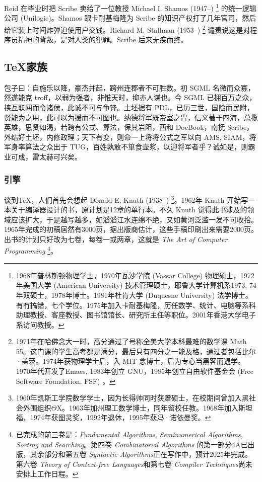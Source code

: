 Reid 在毕业时把 Scribe 卖给了一位教授 Michael I. Shamos (1947--)\indexShamos{} \footnote{1968年普林斯顿物理学士，1970年瓦沙学院 (Vassar College) 物理硕士，1972年美国大学 (American University) 技术管理硕士，耶鲁大学计算机系1973, 74年双硕士，1978年博士。1981年杜肯大学 (Duquesne University) 法学博士。有冇搞错，七个学位。1975年加入卡耐基梅隆，历任数学、统计、电脑等系科助理教授、客座教授、图书馆馆长、研究所主任等职位。2001年香港大学电子系访问教授。} 的统一逻辑公司 (Unilogic)\indexUnilogic{}。Shamos 跟卡耐基梅隆为 Scribe 的知识产权打了几年官司，然后给它装上时间炸弹迫使用户交钱。Richard M. Stallman (1953--)\indexStallman{} \footnote{1971年在哈佛念大一时，高分通过了号称全美大学本科最难的数学课 Math 55。这门课的学生高考都是满分，最后只有四分之一能及格，通过者包括比尔·盖茨。1974年获物理学士后，入 MIT 念博士，后为专心当黑客而退学。1970年代开发了Emacs, 1983年创立 GNU，1985年创立自由软件基金会 (Free Software Foundation, FSF) 。} 谴责说这是对程序员精神的背叛，是对人类的犯罪。Scribe 后来无疾而终。

\subsection{\TeX 家族}
\label{sec:tex}

包子曰：自施乐以降，豪杰并起，跨州连郡者不可胜数。初 SGML 名微而众寡，然遂能克 troff，以弱为强者，非惟天时，抑亦人谋也。今 SGML 已拥百万之众，挟互联网而令诸侯，此诚不可与争锋。土坯据有 PDL，已历三世，国险而民附，贤能为之用，此可以为援而不可图也。纳德将军既帝室之胄，信义著于四海，总揽英雄，思贤如渴，若跨有公式、算法，保其岩阻，西和 DocBook，南抚 Scribe，外结好土坯，内修政理；天下有变，则命一上将将公式之军以向 AMS, SIAM，将军身率算法之众出于 TUG，百姓孰敢不箪食壶浆，以迎将军者乎？诚如是，则霸业可成，雷太赫可兴矣。

\subsubsection{引擎}

谈到\TeX{}，人们首先会想起 Donald E. Knuth (1938--)\indexKnuth{} \footnote{1960年凯斯工学院数学学士，因为长得帅同时获赠硕士，在校期间曾加入黑社会外围组织$\Theta\mathrm{X}$。1963年加州理工数学博士，同年留校任教。1968年加入斯坦福\indexStanford{}，1974年获图灵奖，1992年退休，1995年获冯·诺依曼奖。}。1962年 Knuth 开始写一本关于编译器设计的书，原计划是12章的单行本。不久 Knuth 觉得此书涉及的领域应该扩大，于是越写越多，如滔滔江水连绵不绝，又如黄河泛滥一发不可收拾。1965年完成的初稿居然有3000页，据出版商估计，这些手稿印刷出来需要2000页。出书的计划只好改为七卷，每卷一或两章，这就是 \emph{The Art of Computer Programming} \footnote{已完成的前三卷是：\emph{Fundamental Algorithms}, \emph{Seminumerical Algorithms}, \emph{Sorting and Searching}。第四卷 \emph{Combinatorial Algorithms} 的第一部分4A已出版，其余部分和第五卷 \emph{Syntactic Algorithms}正在写作中，预计2025年完成。第六卷 \emph{Theory of Context-free Languages}和第七卷 \emph{Compiler Techniques}尚未安排上工作日程。}。

